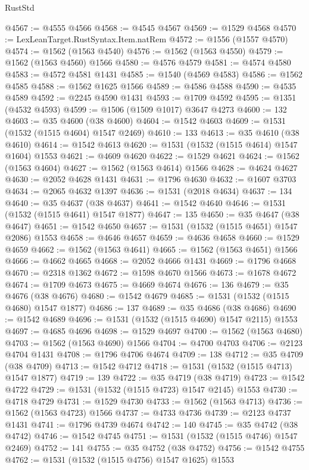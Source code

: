 \begin{lexlean}{RustStd}
\begin{coremodule}
@4567 := @4555 @4566
@4568 := @4545 @4567
@4569 := @1529 @4568
@4570 := LexLeanTarget.RustSyntax.Item.natRem
@4572 := @1556 (@1557 @4570)
@4574 := @1562 (@1563 @4540)
@4576 := @1562 (@1563 @4550)
@4579 := @1562 (@1563 @4560) @1566
@4580 := @4576 @4579
@4581 := @4574 @4580
@4583 := @4572 @4581 @1431
@4585 := @1540 (@4569 @4583)
@4586 := @1562 @4585
@4588 := @1562 @1625 @1566
@4589 := @4586 @4588
@4590 := @4535 @4589
@4592 := @2245 @4590 @1431
@4593 := @1709 @4592
@4595 := @1351 (@4532 @4593)
@4599 := @1506 (@1509 @1017) @3647 @4273
@4600 := 132
@4603 := @35 @4600 (@38 @4600)
@4604 := @1542 @4603
@4609 := @1531 (@1532 (@1515 @4604) @1547 @2469)
@4610 := 133
@4613 := @35 @4610 (@38 @4610)
@4614 := @1542 @4613
@4620 := @1531 (@1532 (@1515 @4614) @1547 @1604) @1553
@4621 := @4609 @4620
@4622 := @1529 @4621
@4624 := @1562 (@1563 @4604)
@4627 := @1562 (@1563 @4614) @1566
@4628 := @4624 @4627
@4630 := @2052 @4628 @1431
@4631 := @1796 @4630
@4632 := @1607 @3703
@4634 := @2065 @4632 @1397
@4636 := @1531 (@2018 @4634)
@4637 := 134
@4640 := @35 @4637 (@38 @4637)
@4641 := @1542 @4640
@4646 := @1531 (@1532 (@1515 @4641) @1547 @1877)
@4647 := 135
@4650 := @35 @4647 (@38 @4647)
@4651 := @1542 @4650
@4657 := @1531 (@1532 (@1515 @4651) @1547 @2086) @1553
@4658 := @4646 @4657
@4659 := @4636 @4658
@4660 := @1529 @4659
@4662 := @1562 (@1563 @4641)
@4665 := @1562 (@1563 @4651) @1566
@4666 := @4662 @4665
@4668 := @2052 @4666 @1431
@4669 := @1796 @4668
@4670 := @2318 @1362
@4672 := @1598 @4670 @1566
@4673 := @1678 @4672
@4674 := @1709 @4673
@4675 := @4669 @4674
@4676 := 136
@4679 := @35 @4676 (@38 @4676)
@4680 := @1542 @4679
@4685 := @1531 (@1532 (@1515 @4680) @1547 @1877)
@4686 := 137
@4689 := @35 @4686 (@38 @4686)
@4690 := @1542 @4689
@4696 := @1531 (@1532 (@1515 @4690) @1547 @2115) @1553
@4697 := @4685 @4696
@4698 := @1529 @4697
@4700 := @1562 (@1563 @4680)
@4703 := @1562 (@1563 @4690) @1566
@4704 := @4700 @4703
@4706 := @2123 @4704 @1431
@4708 := @1796 @4706 @4674
@4709 := 138
@4712 := @35 @4709 (@38 @4709)
@4713 := @1542 @4712
@4718 := @1531 (@1532 (@1515 @4713) @1547 @1877)
@4719 := 139
@4722 := @35 @4719 (@38 @4719)
@4723 := @1542 @4722
@4729 := @1531 (@1532 (@1515 @4723) @1547 @2145) @1553
@4730 := @4718 @4729
@4731 := @1529 @4730
@4733 := @1562 (@1563 @4713)
@4736 := @1562 (@1563 @4723) @1566
@4737 := @4733 @4736
@4739 := @2123 @4737 @1431
@4741 := @1796 @4739 @4674
@4742 := 140
@4745 := @35 @4742 (@38 @4742)
@4746 := @1542 @4745
@4751 := @1531 (@1532 (@1515 @4746) @1547 @2469)
@4752 := 141
@4755 := @35 @4752 (@38 @4752)
@4756 := @1542 @4755
@4762 := @1531 (@1532 (@1515 @4756) @1547 @1625) @1553

\end{coremodule}
\end{lexlean}
